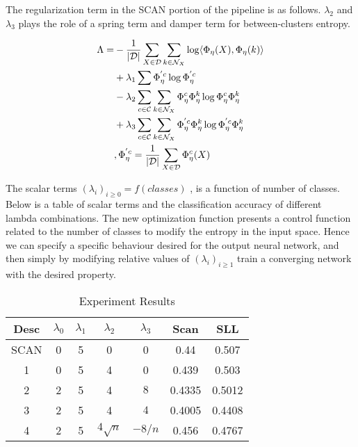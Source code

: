 \documentclass[journal]{journal}
\begin{document}
The regularization term in the SCAN portion of the pipeline is as follows. $\lambda_{2}$ and $\lambda_{3}$ plays the role of a spring term and damper term for between-clusters entropy.

\begin{equation}
\begin{aligned}
\Lambda =   & -\frac{1}{|\mathcal{D}|} \sum_{X \in \mathcal{D}} \sum_{k \in \mathcal{N}_X} \log \langle \Phi_{\eta}(X), \Phi_{\eta}(k) \rangle \\
& +  \lambda_{1} \sum  \Phi_{\eta}^{'c} \log  \Phi_{\eta}^{'c} \\
& - \lambda_{2} \sum_{c \in \mathcal{C}} \sum_{k \in \mathcal{N}_X} \Phi_{\eta}^{c} \Phi_{\eta}^{k} \log  \Phi_{\eta}^{c}\Phi_{\eta}^{k}  \\
& + \lambda_{3} \sum_{c \in \mathcal{C}}  \sum_{k \in \mathcal{N}_X} \Phi_{\eta}^{'c} \Phi_{\eta}^{k} \log  \Phi_{\eta}^{'c} \Phi_{\eta}^{k} \\
& , \space \Phi_{\eta}^{'c} = \frac{1}{|\mathcal{D}|} \sum_{X \in \mathcal{D}}  \Phi_{\eta}^{c} (X)
\end{aligned}
\end{equation}

The scalar terms $(\lambda_i)_{i \geq 0} = f(classes)$ , is a function of number of classes. Below is a table of scalar terms and the classification accuracy of different lambda combinations. The new optimization function presents a control function related to the number of classes to modify the entropy in the input space. Hence we can specify a specific behaviour desired for the output neural network, and then simply by modifying relative values of  $(\lambda_i)_{i \geq 1}$ train a converging network with the desired property.
\begin{table}[h]
\centering
\label{tab:tabela1}
\begin{tabular}{|c|c|c|c|c|c|c|}
\hline
Desc & $\lambda_{0}$ & $\lambda_{1}$ & $\lambda_{2}$ & $\lambda_{3}$ & Scan & SLL  \\ \hline
SCAN & 0 & 5 & 0 & 0 & 0.44 & 0.507       \\
1 & 0 & 5 & 4 & 0 & 0.439 & 0.503 \\
2 & 2 & 5 & 4 & $8$ & 0.4335 & 0.5012 \\
3 & 2 & 5 & 4 & $4$ & 0.4005 & 0.4408 \\
4 & 2 & 5 & $4\sqrt{n}$ & $-8/n$ & 0.456 & 0.4767 \\
\hline
\end{tabular}
\caption{Experiment Results}
\end{table}
\end{document}
